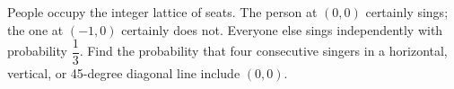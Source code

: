 People occupy the integer lattice of seats. The person at $(0,0)$ certainly sings; the one at $(-1,0)$ certainly does not. Everyone else sings independently with probability $\dfrac{1}{3}$. Find the probability that four consecutive singers in a horizontal, vertical, or 45-degree diagonal line include $(0,0)$.
